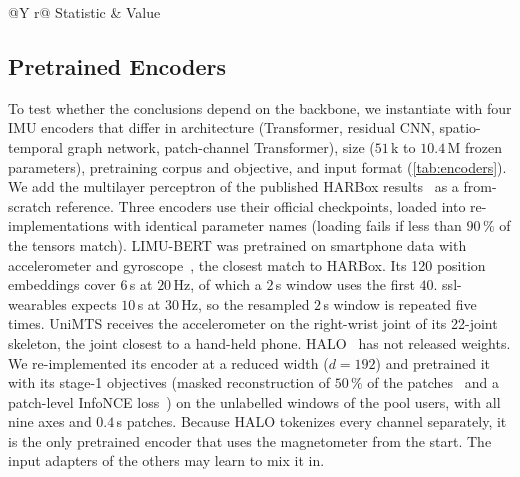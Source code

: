 \begin{table}[!t]
\centering
\caption{Statistical heterogeneity of the \HBUsers{} HARBox users. JSD: Jensen--Shannon divergence in bits.}
\label{tab:hetero}
\footnotesize
\renewcommand{\arraystretch}{1.1}
\begin{tabularx}{\columnwidth}{@{}Y r@{}}
\toprule
Statistic & Value \\
\midrule
{}
\bottomrule
\end{tabularx}
\end{table}

\subsection{Pretrained Encoders}\label{sec:data:encoders}

To test whether the conclusions depend on the backbone, we instantiate \method{} with four IMU
encoders that differ in architecture (Transformer, residual CNN, spatio-temporal graph network,
patch-channel Transformer), size ($51$\,k to $10.4$\,M frozen parameters), pretraining corpus and
objective, and input format (\cref{tab:encoders}). We add the multilayer perceptron of the published
HARBox results~\cite{ouyang2021clusterfl,li2023fedchar} as a from-scratch reference. Three encoders use their official
checkpoints, loaded into re-implementations with identical parameter names (loading fails if
less than $90\,\%$ of the tensors match). LIMU-BERT was pretrained on smartphone data with
accelerometer and gyroscope~\cite{stisen2015smart}, the closest match to HARBox. Its 120 position
embeddings cover $6$\,s at $20$\,Hz, of which a $2$\,s window uses the first $40$. ssl-wearables expects
$10$\,s at $30$\,Hz, so the resampled $2$\,s window is repeated five times. UniMTS receives the
accelerometer on the right-wrist joint of its 22-joint skeleton, the joint closest to a
hand-held phone. HALO~\cite{ding2026halo} has not released weights. We re-implemented its encoder at a
reduced width ($d=192$) and pretrained it with its stage-1 objectives (masked reconstruction of
$50\,\%$ of the patches~\cite{he2022masked} and a patch-level InfoNCE loss~\cite{oord2018representation})
on the unlabelled windows of the pool users, with all nine axes and $0.4$\,s patches. Because HALO
tokenizes every channel separately, it is the only pretrained encoder that uses the magnetometer
from the start. The input adapters of the others may learn to mix it in.

